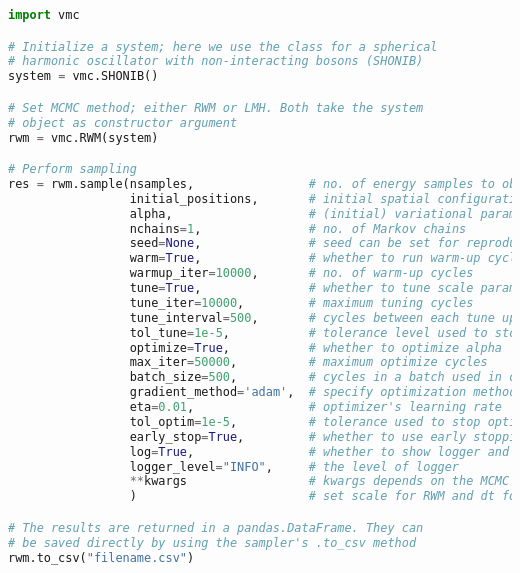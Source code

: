 \begin{lstlisting}[language=python]
import vmc

# Initialize a system; here we use the class for a spherical
# harmonic oscillator with non-interacting bosons (SHONIB)
system = vmc.SHONIB()

# Set MCMC method; either RWM or LMH. Both take the system 
# object as constructor argument
rwm = vmc.RWM(system)

# Perform sampling 
res = rwm.sample(nsamples,                # no. of energy samples to obtain
                 initial_positions,       # initial spatial configuration
                 alpha,                   # (initial) variational parameter
                 nchains=1,               # no. of Markov chains
                 seed=None,               # seed can be set for reproducibility
                 warm=True,               # whether to run warm-up cycles
                 warmup_iter=10000,       # no. of warm-up cycles
                 tune=True,               # whether to tune scale parameters
                 tune_iter=10000,         # maximum tuning cycles
                 tune_interval=500,       # cycles between each tune update
                 tol_tune=1e-5,           # tolerance level used to stop tune early 
                 optimize=True,           # whether to optimize alpha 
                 max_iter=50000,          # maximum optimize cycles 
                 batch_size=500,          # cycles in a batch used in optimization
                 gradient_method='adam',  # specify optimization method 
                 eta=0.01,                # optimizer's learning rate
                 tol_optim=1e-5,          # tolerance used to stop optimizer early 
                 early_stop=True,         # whether to use early stopping or not 
                 log=True,                # whether to show logger and progress bar
                 logger_level="INFO",     # the level of logger 
                 **kwargs                 # kwargs depends on the MCMC method; 
                 )                        # set scale for RWM and dt for LMH 

# The results are returned in a pandas.DataFrame. They can
# be saved directly by using the sampler's .to_csv method
rwm.to_csv("filename.csv") 
\end{lstlisting}